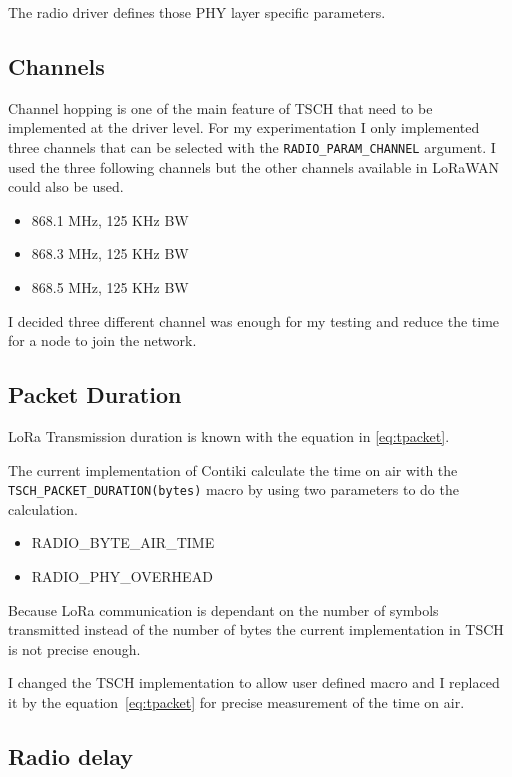 The radio driver defines those PHY layer specific parameters.

\subsection{Channels}

Channel hopping is one of the main feature of TSCH that need to be implemented
at the driver level.
For my experimentation I only implemented three channels that can be selected
with the \lstinline{RADIO_PARAM_CHANNEL} argument.
I used the three following channels but the other channels available in LoRaWAN
could also be used.

\begin{itemize}
  \item 868.1 MHz, 125 KHz BW
  \item 868.3 MHz, 125 KHz BW
  \item 868.5 MHz, 125 KHz BW
\end{itemize}

I decided three different channel was enough for my testing and reduce the time
for a node to join the network.

\subsection{Packet Duration\label{section:transmissiontime}}

LoRa Transmission duration is known with the equation
in \ref{eq:tpacket}.

The current implementation of Contiki calculate the time on air with the
\lstinline{TSCH_PACKET_DURATION(bytes)} macro by using two parameters to do the
calculation.

\begin{itemize}
  \item RADIO\_BYTE\_AIR\_TIME
  \item RADIO\_PHY\_OVERHEAD
\end{itemize}

Because LoRa communication is dependant on the number of symbols transmitted
instead of the number of bytes the current implementation in TSCH is not
precise enough.

I changed the TSCH implementation to allow user defined macro and
I replaced it by the equation~\ref{eq:tpacket} for precise measurement
of the time on air.

\subsection{Radio delay}


